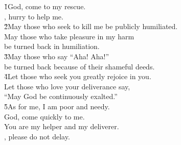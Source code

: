 \begin{poetry}
\poeml \v{1}God, come to my rescue. \\
\poemll    {}, hurry to help me. \\
\poeml \v{2}May those who seek to kill me be publicly humiliated. \\
\poemll    May those who take pleasure in my harm \\
\poemlll       be turned back in humiliation. \\
\poeml \v{3}May those who say ``Aha! Aha!'' \\
\poemll    be turned back because of their shameful deeds. \\
\poeml \v{4}Let those who seek you greatly rejoice in you. \\
\poemll    Let those who love your deliverance say, \\
\poemlll       ``May God be continuously exalted.'' \\
\poeml \v{5}As for me, I am poor and needy. \\
\poemll    God, come quickly to me. \\
\poeml You are my helper and my deliverer. \\
\poemll    {}, please do not delay.
\end{poetry}

